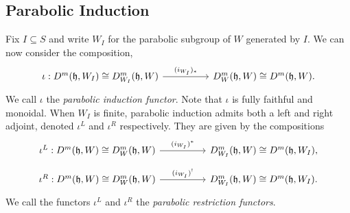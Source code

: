 \documentclass{amsart}
\newcommand{\BE}{D^m}
\newcommand{\fr}[1]{\mathfrak{#1}}
\theoremstyle{definition}
\begin{document}
        \subsection{Parabolic Induction} 

         Fix $I \subseteq S$ and write $W_I$ for the parabolic subgroup of $W$ generated by $I$.
        We can now consider the composition,
        \[\begin{tikzcd}
{\iota : \BE (\fr{h}, W_I) \cong \BE_{W_I} (\fr{h}, W)} \arrow[rr, "(i_{W_I})_*"] & & {\BE_{W} (\fr{h}, W) \cong \BE (\fr{h}, W).}
\end{tikzcd}\]
        We call $\iota$ the \emph{parabolic induction functor}. 
        Note that $\iota$ is fully faithful and monoidal. When $W_I$ is finite, parabolic induction admits both a left and right adjoint, denoted $\iota^L$ and $\iota^R$ respectively. 
        They are given by the compositions
        \[\begin{tikzcd}
{\iota^L : \BE (\fr{h}, W) \cong \BE_{W} (\fr{h}, W)} \arrow[rr, "(i_{W_I})^*"] &  & {\BE_{W_I} (\fr{h}, W) \cong \BE (\fr{h}, W_I),}
\end{tikzcd}\]
        \[\begin{tikzcd}
{\iota^R : \BE (\fr{h}, W) \cong \BE_{W} (\fr{h}, W)} \arrow[rr, "(i_{W_I})^!"] &  & {\BE_{W_I} (\fr{h}, W) \cong \BE (\fr{h}, W_I).}
\end{tikzcd}\]
We call the functors $\iota^L$ and $\iota^R$ the \emph{parabolic restriction functors}.
\end{document}
